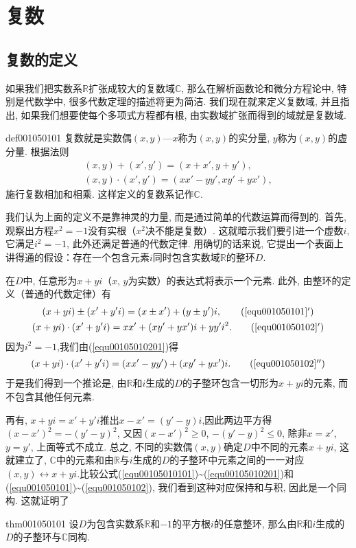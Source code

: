 \chapter{复数}\label{chapter00105}

\section{复数的定义}\label{section0010501}
如果我们把实数系$\mathbb{R}$扩张成较大的复数域$\mathbb{C}$, 那么在解析函数论和微分方程论中, 特别是代数学中, 很多代数定理的描述将更为简洁. 我们现在就来定义复数域, 并且指出, 如果我们想要使每个多项式方程都有根, 由实数域扩张而得到的域就是复数域. 

\begin{definition}{}{def001050101}
复数就是实数偶$(x,y)$---$x$称为$(x, y)$的实分量, $y$称为$(x, y)$的虚分量. 根据法则
\begin{gather}
(x, y) + (x', y') = (x+x', y+y'), \label{equ001050101}\\
(x, y) \cdot (x', y') = (xx'-yy', xy'+yx'), \label{equ001050102}
\end{gather}
施行复数相加和相乘. 这样定义的复数系记作$\mathbb{C}$.
\end{definition}

我们认为上面的定义不是靠神灵的力量, 而是通过简单的代数运算而得到的. 首先, 观察出方程$x^2=-1$没有实根（$x^2$决不能是复数）. 这就暗示我们要引进一个虚数$i$, 它满足$i^2=-1$, 此外还满足普通的代数定律. 用确切的话来说, 它提出一个表面上讲得通的假设：存在一个包含元素$i$同时包含实数域$\mathbb{R}$的整环$D$.

在$D$中, 任意形为$x+yi$（$x$, $y$为实数）的表达式将表示一个元素. 此外, 由整环的定义（普通的代数定律）有
\begin{gather}
(x+yi) \pm (x'+y'i) = (x \pm x') + (y \pm y')i, \tag{\ref{equ001050101}$'$}\label{equ00105010101}\\
(x+yi) \cdot (x'+y'i) = xx'+(xy'+yx')i + yy'i^2. \tag{\ref{equ001050102}$'$}\label{equ00105010201}
\end{gather}
因为$i^2=-1$,我们由(\ref{equ00105010201})得
\begin{gather}
(x+yi)\cdot(x'+y'i) = (xx'-yy') + (xy'+yx')i.\tag{\ref{equ001050102}$''$}\label{00105010202}
\end{gather}
于是我们得到一个推论是, 由$\mathbb{R}$和$i$生成的$D$的子整环包含一切形为$x+yi$的元素, 而不包含其他任何元素. 

再有, $x+yi = x'+y'i$推出$x-x'=(y'-y)i$,因此两边平方得$(x-x')^2 = -(y'-y)^2$, 又因$(x-x')^2 \ge 0$, $-(y'-y)^2 \le 0$, 除非$x=x'$, $y=y'$, 上面等式不成立. 总之, 不同的实数偶$(x, y)$确定$D$中不同的元素$x+yi$, 这就建立了, $\mathbb{C}$中的元素和由$\mathbb{R}$与$i$生成的$D$的子整环中元素之间的一一对应$(x,y) \leftrightarrow x+yi$.比较公式(\ref{equ00105010101})\textasciitilde(\ref{equ00105010201})和(\ref{equ001050101})\textasciitilde(\ref{equ001050102}), 我们看到这种对应保持和与积, 因此是一个同构. 这就证明了
\begin{theorem}{}{thm001050101}
设$D$为包含实数系$\mathbb{R}$和$-1$的平方根$i$的任意整环, 那么由$\mathbb{R}$和$i$生成的$D$的子整环与$\mathbb{C}$同构. 
\end{theorem}

